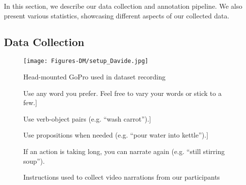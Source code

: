 \documentclass[runningheads]{llncs}
\begin{document}
In this section, we describe our data collection and annotation pipeline. We also present various statistics, showcasing different aspects of our collected data.

\vspace{-1mm}
\subsection{Data Collection}
\label{sec:recording}

\begin{figure}[t]
\centering
{\texttt{[image: Figures-DM/setup\_Davide.jpg]}}
\caption{Head-mounted GoPro used in dataset recording}
\label{fig:setup}
\end{figure}
\begin{figure}[t!]
\begin{tcolorbox}[width=\linewidth,boxrule=1pt,colback=blue!4,left=2pt,right=2pt,top=2pt,bottom=2pt]
\scriptsize{
\noindent Use any word you prefer. Feel free to vary your words or stick to a few.\-2.3mm]

\noindent Use verb-object pairs (e.g. “wash carrot”).\-2.3mm] 

\noindent Use propositions when needed (e.g. ``pour water into kettle'').\-2.3mm]

\noindent If an action is taking long, you can narrate again (e.g. ``still stirring soup'').}
\end{tcolorbox}
\vspace{-3mm}
\caption{Instructions used to collect video narrations from our participants}
\label{fig:narrationInstruction}
\vspace{-2mm}
\end{figure}
\end{document}
